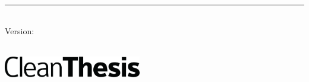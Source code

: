 %
\begin{titlepage}
	\flushright
	\hfill
	\vfill
	{\LARGE\thesisTitle \par}
	\rule[5pt]{\textwidth}{.4pt} \par
	{\Large\thesisName}
	\vfill
	\textit{\large\thesisDate} \\
	Version: \thesisVersion
\end{titlepage}


\begin{titlepage}
	\tgherosfont
	\centering

	{\Large \thesisUniversity} \\[4mm]
	\includegraphics[width=6cm]{gfx/Clean-Thesis-Logo} \\[2mm]
	\textsf{\thesisUniversityDepartment} \\
	\textsf{\thesisUniversityInstitute} \\
	\textsf{\thesisUniversityGroup} \\

	\vfill
	{\large \thesisSubject} \\[5mm]
	{\LARGE \color{ctcolortitle}\textbf{\thesisTitle} \\[10mm]}
	{\Large \thesisName} \\


\end{titlepage}
